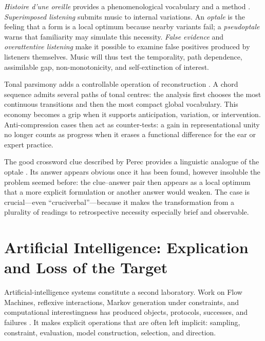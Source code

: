 \documentclass[11pt,a4paper]{article}
\begin{document}
\emph{Histoire d'une oreille} provides a phenomenological vocabulary and a
method \parencite{pachet2018oreille}. \emph{Superimposed listening} submits
music to internal variations. An \emph{optale} is the feeling that a form is a
local optimum because nearby variants fail; a \emph{pseudoptale} warns that
familiarity may simulate this necessity. \emph{False evidence} and
\emph{overattentive listening} make it possible to examine false positives
produced by listeners themselves. Music will thus test the temporality, path
dependence, assimilable gap, non-monotonicity, and self-extinction of interest.

Tonal parsimony adds a controllable operation of reconstruction
\parencite{pachet2026tonalparsimony}. A chord sequence admits several paths of
tonal centres: the analysis first chooses the most continuous transitions and
then the most compact global vocabulary. This economy becomes a grip when it
supports anticipation, variation, or intervention. Anti-compression cases then
act as counter-tests: a gain in representational unity no longer counts as
progress when it erases a functional difference for the ear or expert practice.

The good crossword clue described by Perec provides a linguistic analogue of
the optale \parencite{perec1999motscroises}. Its answer appears obvious once it
has been found, however insoluble the problem seemed before: the clue--answer pair then
appears as a local optimum that a more explicit formulation or another answer
would weaken. The case is crucial---even ``cruciverbal''---because it makes the
transformation from a plurality of readings to retrospective necessity
especially brief and observable.

\section{Artificial Intelligence: Explication and Loss of the Target}

Artificial-intelligence systems constitute a second laboratory. Work on Flow
Machines, reflexive interactions, Markov generation under constraints, and
computational interestingness has produced objects, protocols, successes, and
failures
\parencite{pachet1999surprising,pachet1999active,pachet1999programs,pachet2000melodie,
pachet2002continuatorinteraction,pachet2004flowmachines,pachet2004reification,
pachet2004cybernetic,pachet2004childrenreflect,addessi2005experiments,
pachet2006clefs,pachet2006creativity,pachet2006reflective,pachet2008machines,
jones2009stimulating,pachet2006interactionsreflexives,addessi2006flowmachine,
aucouturier2002similarity,pachetroy2008hitsong,pachet2011hitsong,
lerch2011closedloop,
milipachet1995regularity,pachet2012virtuosity,martin2016creativeprocess,
pachet2021assisted,pachet2026markov}.
It makes explicit operations that are often left implicit: sampling,
constraint, evaluation, model construction, selection, and direction.
\end{document}

